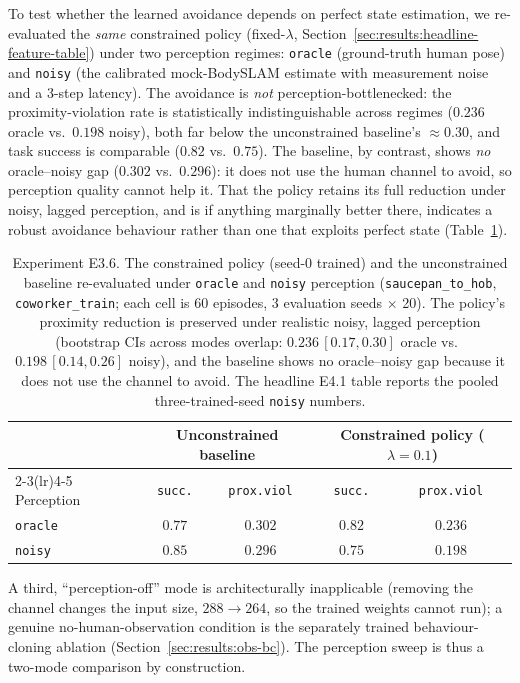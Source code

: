 \documentclass[11pt,a4paper]{report}
\newcommand{\bodyslampp}{BodySLAM\nolinebreak[4]\hspace{-.05em}\raisebox{.2ex}{\scriptsize ++}}
\begin{document}
To test whether the learned avoidance depends on perfect state
estimation, we re-evaluated the \emph{same} constrained policy
(fixed-$\lambda$, Section~\ref{sec:results:headline-feature-table})
under two perception regimes: \texttt{oracle} (ground-truth human
pose) and \texttt{noisy} (the calibrated mock-\bodyslampp{} estimate
with measurement noise and a 3-step latency). The avoidance is
\emph{not} perception-bottlenecked: the proximity-violation rate is
statistically indistinguishable across regimes ($0.236$ oracle vs.\
$0.198$ noisy), both far below the unconstrained baseline's
$\approx$0.30, and task success is comparable ($0.82$ vs.\ $0.75$).
The baseline, by contrast, shows \emph{no} oracle--noisy gap ($0.302$
vs.\ $0.296$): it does not use the human channel to avoid, so
perception quality cannot help it. That the policy retains its full
reduction under noisy, lagged perception, and is if anything
marginally better there, indicates a robust avoidance behaviour
rather than one that exploits perfect state
(Table~\ref{tab:e3.6-obs-rl}).

\begin{table}[htbp]
\centering
\caption{Experiment E3.6. The constrained policy (seed-0 trained)
and the unconstrained baseline re-evaluated under \texttt{oracle} and
\texttt{noisy} perception (\texttt{saucepan\_to\_hob},
\texttt{coworker\_train}; each cell is 60 episodes, 3 evaluation
seeds $\times$ 20). The policy's proximity reduction is preserved
under realistic noisy, lagged perception (bootstrap CIs across modes
overlap: $0.236\,[0.17, 0.30]$ oracle vs.\ $0.198\,[0.14, 0.26]$
noisy), and the baseline shows no oracle--noisy gap because it does
not use the channel to avoid. The headline E4.1 table reports the
pooled three-trained-seed \texttt{noisy} numbers.}
\label{tab:e3.6-obs-rl}
\small
\begin{tabular}{lcccc}
\toprule
 & \multicolumn{2}{c}{Unconstrained baseline} & \multicolumn{2}{c}{Constrained policy ($\lambda{=}0.1$)} \\
\cmidrule(lr){2-3}\cmidrule(lr){4-5}
Perception & \texttt{succ.} & \texttt{prox.viol} & \texttt{succ.} & \texttt{prox.viol} \\
\midrule
\texttt{oracle} & $0.77$ & $0.302$ & $0.82$ & $0.236$ \\
\texttt{noisy}  & $0.85$ & $0.296$ & $0.75$ & $0.198$ \\
\bottomrule
\end{tabular}
\end{table}

A third, ``perception-off'' mode is architecturally inapplicable
(removing the channel changes the input size, $288 \to 264$, so the
trained weights cannot run); a genuine no-human-observation
condition is the separately trained behaviour-cloning ablation
(Section~\ref{sec:results:obs-bc}). The perception sweep is thus a
two-mode comparison by construction.
\end{document}

